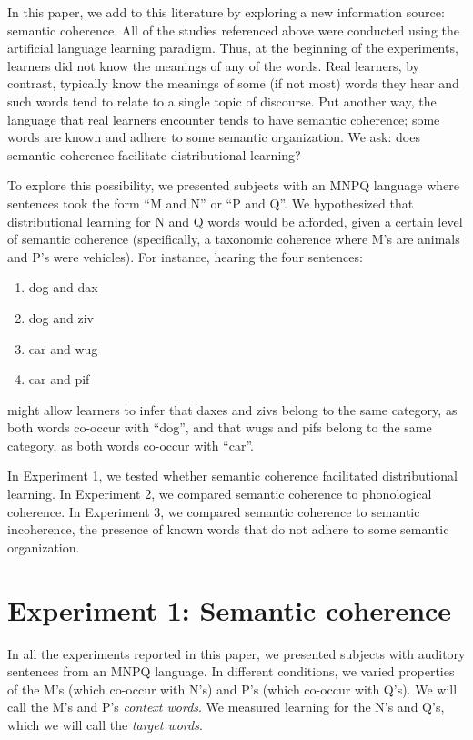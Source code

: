 \documentclass[man,floatsintext]{apa6}
\begin{document}
In this paper, we add to this literature by exploring a new
information source: semantic coherence. All of the studies referenced
above were conducted using the artificial language learning
paradigm. Thus, at the beginning of the experiments, learners did not
know the meanings of any of the words. Real learners, by contrast,
typically know the meanings of some (if not most) words they hear and
such words tend to relate to a single topic of discourse. Put another
way, the language that real learners encounter tends to have semantic
coherence; some words are known and adhere to some semantic
organization. We ask: does semantic coherence facilitate
distributional learning?

To explore this possibility, we presented subjects with an MNPQ
language where sentences took the form ``M and N'' or ``P and Q''. We
hypothesized that distributional learning for N and Q words would be
afforded, given a certain level of semantic coherence (specifically, a
taxonomic coherence where M's are animals and P's were vehicles). For
instance, hearing the four sentences:
\begin{enumerate}
\item dog and dax
\item dog and ziv
\item car and wug
\item car and pif
\end{enumerate} might allow learners to infer that daxes and zivs
belong to the same category, as both words co-occur with ``dog'', and
that wugs and pifs belong to the same category, as both words co-occur
with ``car''.

In Experiment 1, we tested whether semantic coherence facilitated
distributional learning. In Experiment 2, we compared semantic
coherence to phonological coherence. In Experiment 3, we compared
semantic coherence to semantic incoherence, the presence of known
words that do not adhere to some semantic organization.

\section{Experiment 1: Semantic coherence}

In all the experiments reported in this paper, we presented subjects
with auditory sentences from an MNPQ language. In different
conditions, we varied properties of the M's (which co-occur with N's)
and P's (which co-occur with Q's). We will call the M's and P's
\emph{context words}. We measured learning for the N's and Q's, which
we will call the \emph{target words}.
\end{document}
